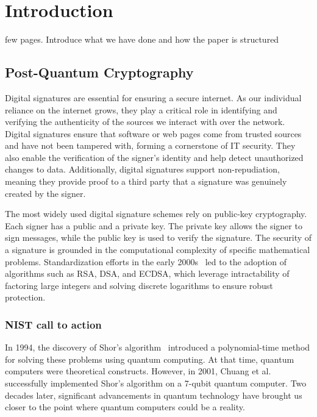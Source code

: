 \documentclass[twoside,11pt,openright]{report}
\theoremstyle{definition}
\theoremstyle{plain}
\begin{document}
\chapter{Introduction}\label{ch:intro}

few pages. Introduce what we have done and how the paper is structured

\section{Post-Quantum Cryptography}\label{sec:quantum}

Digital signatures are essential for ensuring a secure internet. As our individual reliance on the internet grows, they play a critical role in identifying and verifying the authenticity of the sources we interact with over the network. Digital signatures ensure that software or web pages come from trusted sources and have not been tampered with, forming a cornerstone of IT security. They also enable the verification of the signer's identity and help detect unauthorized changes to data. Additionally, digital signatures support non-repudiation, meaning they provide proof to a third party that a signature was genuinely created by the signer.

The most widely used digital signature schemes rely on public-key cryptography. Each signer has a public and a private key. The private key allows the signer to sign messages, while the public key is used to verify the signature. The security of a signature is grounded in the computational complexity of specific mathematical problems. Standardization efforts in the early 2000s~\cite{pub2000digital} led to the adoption of algorithms such as RSA, DSA, and ECDSA, which leverage intractability of factoring large integers and solving discrete logarithms to ensure robust protection.

\subsection{NIST call to action}

In 1994, the discovery of Shor's algorithm~\cite{shor1997} introduced a polynomial-time method for solving these problems using quantum computing. At that time, quantum computers were theoretical constructs. However, in 2001, Chuang et al.~\cite{vandersypen2001experimental,buchmann2004post} successfully implemented Shor's algorithm on a 7-qubit quantum computer. Two decades later, significant advancements in quantum technology have brought us closer to the point where quantum computers could be a reality.
\end{document}
